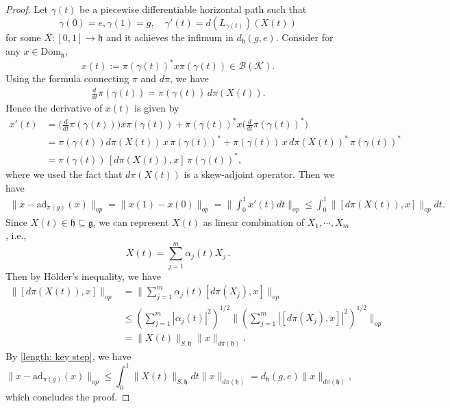 \documentclass[11pt,reqno]{amsart}
\numberwithin{equation}{section}
\newcommand{\mc}{\mathcal}
\newcommand{\adm}{\text{ad}}
\begin{document}
\begin{proof}
Let $\gamma(t)$ be a piecewise differentiable horizontal path such that $$\gamma(0)= e, \gamma(1) = g,\quad \gamma'(t) = d(L_{\gamma(t)})(X(t)) $$ for some $X:[0,1]\to \mathfrak{h}$ and it achieves the infimum in $d_\mathfrak{h}(g,e)$. Consider for any $x\in \text{Dom}_\mathfrak{h}$,
\begin{equation}
x(t) := \pi(\gamma(t))^*x \pi(\gamma(t)) \in \mc B(\mc K).
\end{equation}
Using the formula connecting $\pi$ and $d\pi$, we have
\begin{align*}
    \frac{d}{dt}\pi(\gamma(t)) = \pi(\gamma(t))\, d\pi(X(t)).
\end{align*}
Hence the derivative of $x(t)$ is given by  
\begin{equation}\label{derivative of path}
\begin{aligned}
 x'(t)& = \big(\frac{d}{dt}\pi(\gamma(t))\big) x\pi(\gamma(t)) + \pi(\gamma(t))^* x \big(\frac{d}{dt}\pi(\gamma(t))^*\big)\\
 & = \pi(\gamma(t))d\pi(X(t))\, x\, \pi(\gamma(t))^* + \pi(\gamma(t))\, x\,d\pi(X(t))^*\, \pi(\gamma(t))^* \\
 & = \pi(\gamma(t))\, [d\pi(X(t)), x]\, \pi(\gamma(t))^*,
\end{aligned}
\end{equation}
where we used the fact that $d\pi(X(t))$ is a skew-adjoint operator. Then we have 
\begin{equation}\label{length: key step}
\begin{aligned}
\|x - \adm_{\pi(g)}(x)\|_{op} = \|x(1) - x(0)\|_{op} = \|\int_0^1 x'(t)dt\|_{op} \le \int_0^1 \|[d\pi(X(t)),x]\|_{op} dt.
\end{aligned}
\end{equation}
Since $X(t) \in \mathfrak{h} \subseteq \mathfrak{g}$, we can represent $X(t)$ as linear combination of $X_1,\cdots, X_m$, i.e., 
\begin{equation}
X(t) = \sum_{j=1}^m \alpha_j(t) X_j\,.
\end{equation}
Then by H\"older's inequality, we have 
\begin{equation}
\begin{aligned}
\|[d\pi(X(t)),x]\|_{op}& = \|\sum_{j=1}^m \alpha_j(t)[d\pi(X_j),x]\|_{op} \\
& \le (\sum_{j=1}^m|\alpha_j(t)|^2)^{1/2}\|(\sum_{j=1}^m |[d\pi(X_j),x]|^2)^{1/2}\|_{op} \\
&= \|X(t)\|_{S,\mathfrak{h}} \|x\|_{d\pi(\mathfrak{h})}.
\end{aligned}
\end{equation}
By \eqref{length: key step}, we have 
\begin{equation}
\|x - \adm_{\pi(g)}(x)\|_{op} \le \int_0^1 \|X(t)\|_{S,\mathfrak{h}} dt \|x\|_{d\pi(\mathfrak{h})}=  d_\mathfrak{h}(g,e)\|x\|_{d\pi(\mathfrak{h})},
\end{equation}
which concludes the proof.
\end{proof}	
\end{document}

